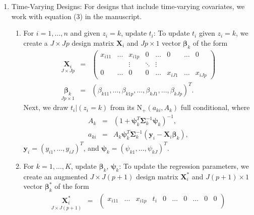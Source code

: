 \documentclass[useAMS,11pt]{article}
\newcommand{\bfb}{\boldsymbol{\beta}}
\newcommand{\1}{\mathbbm{1}}
\begin{document}
\begin{enumerate}
\begin{enumerate}
      \item Time-Varying Designs: For designs that include time-varying covariates, we work with equation (3) in the manuscript.
      \begin{enumerate}
           \item For $i=1,\ldots,n$ and given $z_i=k$, update $t_i$: To update $t_i$ given $z_i=k$, we create a $J \times Jp$ design matrix $\mathbf{X}_i$ and $Jp \times 1$ vector $\boldsymbol\beta_k$ of the form
               \begin{eqnarray*}
               \underset{J\times Jp}{\mathbf{X}_i}&=&\begin{pmatrix}x_{i11} & \ldots & x_{i1p}     & 0       & \ldots           &  0       & \ldots  & 0          \\
                                                                                  &        & \vdots      & \ddots  & \vdots           &          &         &             \\
                                                                          0       & \ldots & 0           & 0       &  \ldots          &  x_{iJ1} & \ldots  & x_{iJp}
                              \end{pmatrix}\\[8pt]
               \underset{Jp \times 1}{\boldsymbol\beta_k}&=&(\beta_{k11},\ldots,\beta_{k1p},\ldots,\beta_{kJ1},\ldots,\beta_{kJp})^T.
               \end{eqnarray*}
          Next, we draw $t_i|(z_i=k)$ from its $\text{N}_{+}(a_{ki},A_{k})$ full conditional, where
          \begin{eqnarray*}
          A_k&=&(1 + \boldsymbol\psi_k^T \boldsymbol\Sigma_k^{-1} \boldsymbol\psi_k)^{-1},\\
          a_{ki}&=&A_k \boldsymbol\psi_k^T \boldsymbol\Sigma_k^{-1} (\mathbf{y}_i - \mathbf{X}_i\bfb_k),
          \end{eqnarray*}
          $\mathbf{y}_{i}=(y_{i1},\ldots,y_{iJ})^T$, and $\boldsymbol\psi_k=(\psi_{k1},\ldots,\psi_{kJ})^T$.\vspace{2pt}
          \item For $k=1,\ldots,K$, update $\boldsymbol\beta_k$, $\boldsymbol\psi_k$: To update the regression parameters, we create an augmented $J \times J(p+1)$ design matrix $\mathbf{X}^*_i$ and $J(p+1) \times 1$ vector $\boldsymbol\beta^*_k$ of the form
               \begin{eqnarray*}
               \underset{J\times J(p+1)}{\mathbf{X}^*_i}&=&\begin{pmatrix}x_{i11} & \ldots & x_{i1p}  & t_i    & 0       & \ldots           &  0       & \ldots  & 0       & 0    \\

\end{pmatrix}
\end{eqnarray*}
\end{enumerate}
\end{enumerate}
\end{enumerate}
\end{document}
